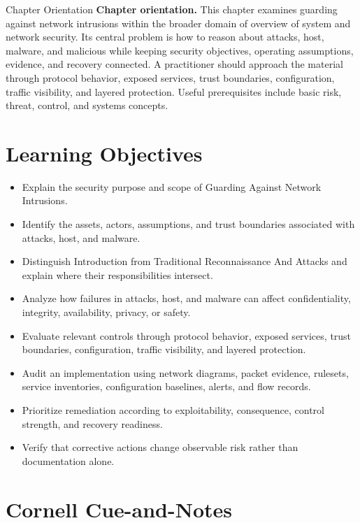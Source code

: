 \documentclass[11pt,letterpaper]{article}
\title{\CornellDocumentTitle}
\author{}
\date{}
\begin{document}
\maketitle
\begin{CornellOverviewBox}{Chapter Orientation}
\textbf{Chapter orientation.} This chapter examines guarding against network intrusions within the broader domain of overview of system and network security. Its central problem is how to reason about attacks, host, malware, and malicious while keeping security objectives, operating assumptions, evidence, and recovery connected. A practitioner should approach the material through protocol behavior, exposed services, trust boundaries, configuration, traffic visibility, and layered protection. Useful prerequisites include basic risk, threat, control, and systems concepts.
\end{CornellOverviewBox}
\section*{Learning Objectives}
\begin{itemize}
\item Explain the security purpose and scope of Guarding Against Network Intrusions.
\item Identify the assets, actors, assumptions, and trust boundaries associated with attacks, host, and malware.
\item Distinguish Introduction from Traditional Reconnaissance And Attacks and explain where their responsibilities intersect.
\item Analyze how failures in attacks, host, and malware can affect confidentiality, integrity, availability, privacy, or safety.
\item Evaluate relevant controls through protocol behavior, exposed services, trust boundaries, configuration, traffic visibility, and layered protection.
\item Audit an implementation using network diagrams, packet evidence, rulesets, service inventories, configuration baselines, alerts, and flow records.
\item Prioritize remediation according to exploitability, consequence, control strength, and recovery readiness.
\item Verify that corrective actions change observable risk rather than documentation alone.
\end{itemize}
\section*{Cornell Cue-and-Notes}
\end{document}
